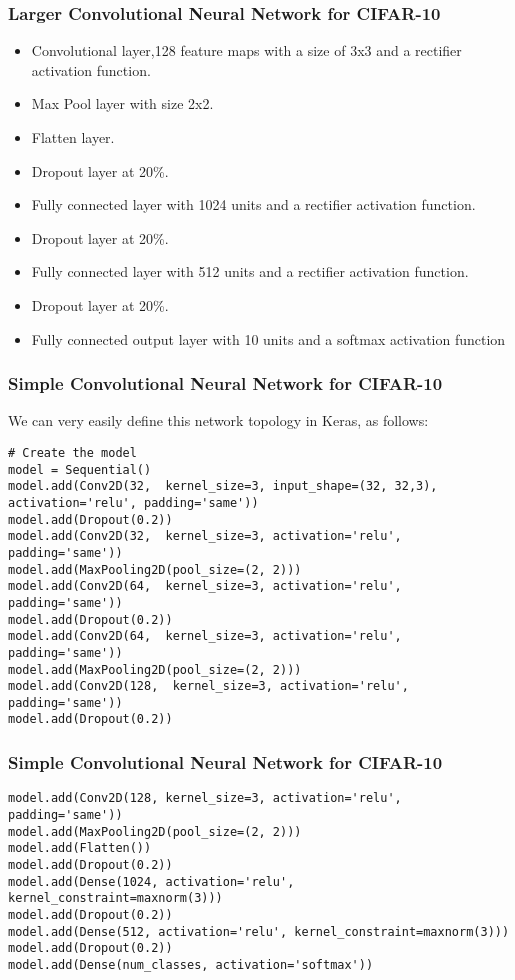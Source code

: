 \begin{frame}[fragile] \frametitle{Larger Convolutional Neural Network for CIFAR-10}

\begin{itemize}
\item Convolutional layer,128 feature maps with a size of 3x3 and a rectifier activation function.
\item Max Pool layer with size 2x2.
\item Flatten layer.
\item Dropout layer at 20\%.
\item Fully connected layer with 1024 units and a rectifier activation function.
\item Dropout layer at 20\%.
\item Fully connected layer with 512 units and a rectifier activation function.
\item Dropout layer at 20\%.
\item Fully connected output layer with 10 units and a softmax activation function
\end{itemize}
\end{frame}


\begin{frame}[fragile] \frametitle{Simple Convolutional Neural Network for CIFAR-10}
We can very easily define this network topology in Keras, as follows:
\begin{lstlisting}
# Create the model
model = Sequential()
model.add(Conv2D(32,  kernel_size=3, input_shape=(32, 32,3), activation='relu', padding='same'))
model.add(Dropout(0.2))
model.add(Conv2D(32,  kernel_size=3, activation='relu', padding='same'))
model.add(MaxPooling2D(pool_size=(2, 2)))
model.add(Conv2D(64,  kernel_size=3, activation='relu', padding='same'))
model.add(Dropout(0.2))
model.add(Conv2D(64,  kernel_size=3, activation='relu', padding='same'))
model.add(MaxPooling2D(pool_size=(2, 2)))
model.add(Conv2D(128,  kernel_size=3, activation='relu', padding='same'))
model.add(Dropout(0.2))
\end{lstlisting}

\end{frame}

\begin{frame}[fragile] \frametitle{Simple Convolutional Neural Network for CIFAR-10}
\begin{lstlisting}
model.add(Conv2D(128, kernel_size=3, activation='relu', padding='same'))
model.add(MaxPooling2D(pool_size=(2, 2)))
model.add(Flatten())
model.add(Dropout(0.2))
model.add(Dense(1024, activation='relu', kernel_constraint=maxnorm(3)))
model.add(Dropout(0.2))
model.add(Dense(512, activation='relu', kernel_constraint=maxnorm(3)))
model.add(Dropout(0.2))
model.add(Dense(num_classes, activation='softmax'))
\end{lstlisting}

\end{frame}

